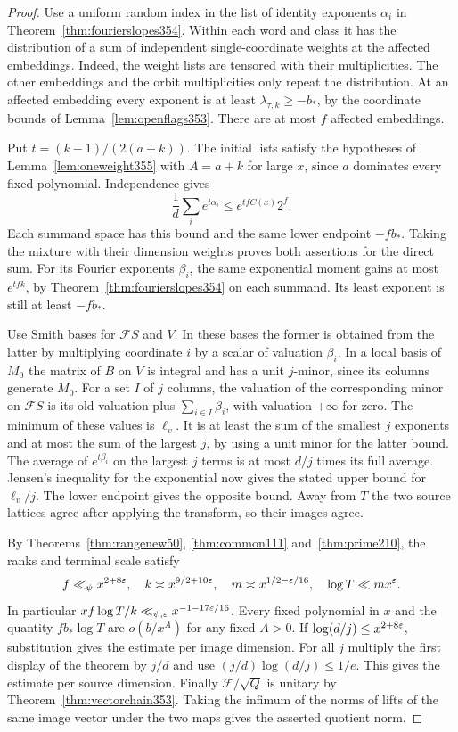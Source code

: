 \documentclass[a4paper,11pt]{article}
\theoremstyle{definition}
\theoremstyle{remark}
\numberwithin{equation}{section}
\begin{document}
\begin{proof}
Use a uniform random index in the list of identity exponents
\(\alpha_i\) in Theorem~\ref{thm:fourierslopes354}. Within each
word and class it has the distribution of a sum of independent
single-coordinate weights at the affected embeddings. Indeed,
the weight lists are tensored with their multiplicities. The
other embeddings and the orbit multiplicities only repeat
the distribution. At an affected embedding every exponent is
at least \(\lambda_{\tau,k}\ge-b_*\), by the coordinate bounds
of Lemma~\ref{lem:openflags353}. There are at most \(f\)
affected embeddings.

Put \(t=(k-1)/(2(a+k))\). The initial lists satisfy the
hypotheses of Lemma~\ref{lem:oneweight355} with \(A=a+k\)
for large \(x\), since \(a\) dominates every fixed polynomial.
Independence gives
\[
         \frac{1}{d}\sum_i e^{t\alpha_i}
                   \le e^{tf C(x)}2^f.
\]
Each summand space has this bound and the same lower endpoint
\(-f b_*\). Taking the mixture with their dimension weights
proves both assertions for the direct sum. For its Fourier
exponents \(\beta_i\), the same exponential moment gains at
most \(e^{tfk}\), by Theorem~\ref{thm:fourierslopes354} on
each summand. Its least exponent is still at least \(-fb_*\).

Use Smith bases for \(\mathcal F S\) and \(V\). In these bases
the former is obtained from the latter by multiplying coordinate
\(i\) by a scalar of valuation \(\beta_i\). In a local basis
of \(M_0\) the matrix of \(B\) on \(V\) is integral and has a
unit \(j\)-minor, since its columns generate \(M_0\). For a
set \(I\) of \(j\) columns, the valuation of the corresponding
minor on \(\mathcal F S\) is its old valuation plus
\(\sum_{i\in I}\beta_i\), with valuation \(+\infty\) for zero.
The minimum of these values is \(\ell_v\). It is at least the
sum of the smallest \(j\) exponents and at most the sum of the
largest \(j\), by using a unit minor for the latter bound.
The average of \(e^{t\beta_i}\) on the largest \(j\) terms
is at most \(d/j\) times its full average. Jensen's inequality
for the exponential now gives the stated upper bound for
\(\ell_v/j\). The lower endpoint gives the opposite bound.
Away from \(T\) the two source lattices agree after applying
the transform, so their images agree.

By Theorems~\ref{thm:rangenew50}, \ref{thm:common111}
and~\ref{thm:prime210}, the ranks and terminal scale satisfy
\[
 f\ll_\psi x^{2+8\varepsilon},\quad k\asymp x^{9/2+10\varepsilon},\quad
 m\asymp x^{1/2-\varepsilon/16},\quad \log T\ll m x^\varepsilon .
\]
In particular \(xf\log T/k\ll_{\psi,\varepsilon}x^{-1-17\varepsilon/16}\).
Every fixed polynomial in \(x\) and the quantity \(f b_*\log T\)
are \(o(b/x^A)\) for any fixed \(A>0\). If
\(\log(d/j)\le x^{2+8\varepsilon}\), substitution gives the estimate
per image dimension. For all \(j\) multiply the first display
of the theorem by \(j/d\) and use
\((j/d)\log(d/j)\le1/e\). This gives the estimate per source
dimension. Finally \(\mathcal F/\sqrt Q\) is unitary by
Theorem~\ref{thm:vectorchain353}. Taking the infimum of the
norms of lifts of the same image vector under the two maps
gives the asserted quotient norm.
\end{proof}
\end{document}
